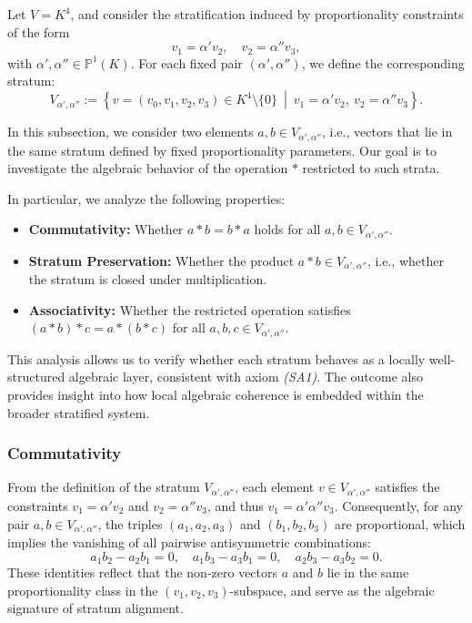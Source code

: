 \documentclass[12pt]{article}
\theoremstyle{definition}
\theoremstyle{plain}
\theoremstyle{remark}
\begin{document}
Let \( V = K^4 \), and consider the stratification induced by proportionality constraints of the form
\[
v_1 = \alpha' v_2, \quad v_2 = \alpha'' v_3,
\]
with \( \alpha', \alpha'' \in \mathbb{P}^1(K) \). For each fixed pair \( (\alpha', \alpha'') \), we define the corresponding stratum:
\[
V_{\alpha', \alpha''} := \left\{ v = (v_0, v_1, v_2, v_3) \in K^4 \setminus \{0\} \ \middle|\  v_1 = \alpha' v_2,\ v_2 = \alpha'' v_3 \right\}.
\]

In this subsection, we consider two elements \( a, b \in V_{\alpha', \alpha''} \), i.e., vectors that lie in the same stratum defined by fixed proportionality parameters. Our goal is to investigate the algebraic behavior of the operation \( * \) restricted to such strata.

In particular, we analyze the following properties:

\begin{itemize}
    \item \textbf{Commutativity:} Whether \( a * b = b * a \) holds for all \( a, b \in V_{\alpha', \alpha''} \).
    
    \item \textbf{Stratum Preservation:} Whether the product \( a * b \in V_{\alpha', \alpha''} \), i.e., whether the stratum is closed under multiplication.
    
    \item \textbf{Associativity:} Whether the restricted operation satisfies \( (a * b) * c = a * (b * c) \) for all \( a, b, c \in V_{\alpha', \alpha''} \).
\end{itemize}

This analysis allows us to verify whether each stratum behaves as a locally well-structured algebraic layer, consistent with axiom \emph{(SA1)}. The outcome also provides insight into how local algebraic coherence is embedded within the broader stratified system.

\subsubsection{Commutativity}

From the definition of the stratum \( V_{\alpha', \alpha''} \), each element \( v \in V_{\alpha', \alpha''} \) satisfies the constraints \( v_1 = \alpha' v_2 \) and \( v_2 = \alpha'' v_3 \), and thus \( v_1 = \alpha' \alpha'' v_3 \). Consequently, for any pair \( a, b \in V_{\alpha', \alpha''} \), the triples \( (a_1, a_2, a_3) \) and \( (b_1, b_2, b_3) \) are proportional, which implies the vanishing of all pairwise antisymmetric combinations:
\[
a_1 b_2 - a_2 b_1 = 0, \quad
a_1 b_3 - a_3 b_1 = 0, \quad
a_2 b_3 - a_3 b_2 = 0.
\]
These identities reflect that the non-zero vectors \( a \) and \( b \) lie in the same proportionality class in the \( (v_1, v_2, v_3) \)-subspace, and serve as the algebraic signature of stratum alignment.
\end{document}
